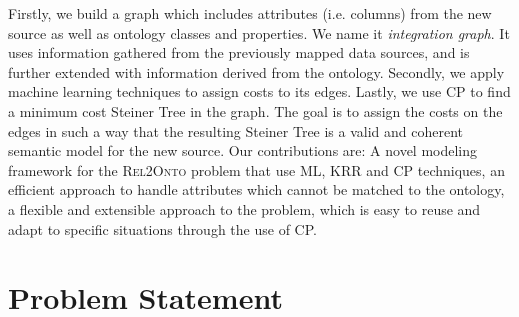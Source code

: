 \documentclass[letterpaper]{article} %
\newcommand{\authornote}[3]{
  {\fbox{\sc 
  #1}:$\blacktriangleright$\textcolor{#2}{\small{#3}}$\blacktriangleleft$}%
}
\newcommand{\npr}[1]{\authornote{NPR}{orange}{#1}}
\newcommand{\relonto}{\textsc{Rel2Onto}}
\newcommand{\forijcai}[1]{}
\begin{document}
Firstly, we build a graph which includes attributes (i.e. columns) from the new
source as well as ontology classes and properties.
We name it \emph{integration graph}.
It uses information gathered from the previously mapped data sources, and is further extended with information derived from the ontology.
Secondly, we apply machine learning techniques to 
assign costs to its edges. 
Lastly, we use CP to 
find a minimum cost Steiner Tree in the graph.
The goal is to assign the costs on the edges in such a way that the resulting 
Steiner Tree is a valid and coherent semantic model for the new source. 
Our contributions are:
	A novel modeling framework for the \relonto{} problem that use ML, KRR and CP techniques,
	an efficient approach to handle attributes which cannot be matched to 
	the ontology, \forijcai{arg1, through a new semantic labeling model and a new STP 
	model with additional nodes in the integration graph.}
	a flexible and extensible approach to the problem, which is easy to 
	reuse and adapt to specific situations through the use of CP.\forijcai{ allows introduction of additional constraints with no changes to the solver.} 

\forijcai{
Section \ref{SEC:problem} formally states the problem. 
In Section \ref{SEC:ML} we present how we convert learnt data into a 
useful data representation. 
Section \ref{SEC:STP} shows how we model the problem as a STP, 
whereas Section \ref{SEC:CP} presents our implementation in CP. 
Section \ref{SEC:Res} shows the results. 
Section \ref{SEC:pw} compares with the previous work done to achieve this task. 
}

\section{Problem Statement \label{SEC:problem}}
\end{document}
